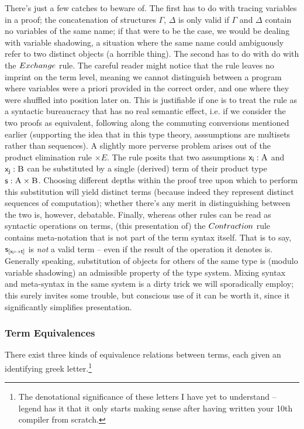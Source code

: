 There's just a few catches to beware of.
The first has to do with tracing variables in a proof; the concatenation of structures $\Gamma$, $\Delta$ is only valid if $\Gamma$ and $\Delta$ contain no variables of the same name; if that were to be the case, we would be dealing with variable shadowing, a situation where the same name could ambiguously refer to two distinct objects (a horrible thing).
The second has to do with do with the $Exchange{}$ rule. 
The careful reader might notice that the rule leaves no imprint on the term level, meaning we cannot distinguish between a program where variables were a priori provided in the correct order, and one where they were shuffled into position later on.
This is justifiable if one is to treat the rule as a syntactic bureaucracy that has no real semantic effect, i.e. if we consider the two proofs as equivalent, following along the commuting conversions mentioned earlier (supporting the idea that in this type theory, asssumptions are multisets rather than sequences).
A slightly more perverse problem arises out of the product elimination rule $\times E$.
The rule posits that two assumptions $\term{x_i}: \prop{A}$ and $\term{x_j}: \prop{B}$ can be substituted by a single (derived) term of their product type $\term{s}: \prop{A}\times\prop{B}$. 
Choosing different depths within the proof tree upon which to perform this substitution will yield distinct terms (because indeed they represent distinct sequences of computation); whether there's any merit in distinguishing between the two is, however, debatable.
Finally, whereas other rules can be read as syntactic operations on terms, (this presentation of) the $Contraction{}$ rule contains meta-notation that is not part of the term syntax itself.
That is to say, $\mathsf{s}_{[\mathsf{x_i} \mapsto \mathsf{t}]}$ is \textit{not} a valid term -- even if the result of the operation it denotes is.
Generally speaking, substitution of objects for others of the same type is (modulo variable shadowing) an admissible property of the type system.
Mixing syntax and meta-syntax in the same system is a dirty trick we will sporadically employ; this surely invites some trouble, but conscious use of it can be worth it, since it significantly simplifies presentation.

\subsubsection{Term Equivalences}
There exist three kinds of equivalence relations between terms, each given an identifying greek letter.\footnote{The denotational significance of these letters I have yet to understand -- legend has it that it only starts making sense after having written your 10th compiler from scratch.}

